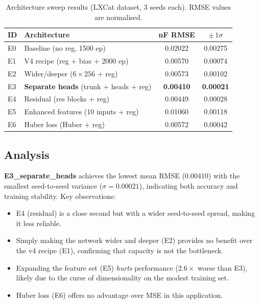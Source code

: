 \documentclass[12pt,a4paper]{article}
\begin{document}
\begin{table}[H]
  \centering
  \caption{Architecture sweep results (LXCat dataset, 3 seeds each).
           RMSE values are normalised.}
  \label{tab:arch_sweep}
  \begin{tabular}{llcc}
    \toprule
    ID & Architecture & nF RMSE & $\pm\,1\sigma$ \\
    \midrule
    E0 & Baseline (no reg, 1500 ep)
       & 0.02022 & 0.00275 \\
    E1 & V4 recipe (reg + bias + 2000 ep)
       & 0.00570 & 0.00074 \\
    E2 & Wider/deeper ($6\times256$ + reg)
       & 0.00573 & 0.00102 \\
    E3 & \textbf{Separate heads} (trunk + heads + reg)
       & \textbf{0.00410} & \textbf{0.00021} \\
    E4 & Residual (res blocks + reg)
       & 0.00449 & 0.00028 \\
    E5 & Enhanced features (10 inputs + reg)
       & 0.01060 & 0.00118 \\
    E6 & Huber loss (Huber + reg)
       & 0.00572 & 0.00042 \\
    \bottomrule
  \end{tabular}
\end{table}

\subsection{Analysis}

\textbf{E3\_separate\_heads} achieves the lowest mean RMSE (0.00410)
with the smallest seed-to-seed variance ($\sigma = 0.00021$),
indicating both accuracy and training stability.  Key observations:
\begin{itemize}
  \item E4 (residual) is a close second but with a wider seed-to-seed
        spread, making it less reliable.
  \item Simply making the network wider and deeper (E2) provides no
        benefit over the v4 recipe (E1), confirming that capacity is
        not the bottleneck.
  \item Expanding the feature set (E5) \emph{hurts} performance
        ($2.6\times$ worse than E3), likely due to the curse of
        dimensionality on the modest training set.
  \item Huber loss (E6) offers no advantage over MSE in this
        application.
\end{itemize}
\end{document}

